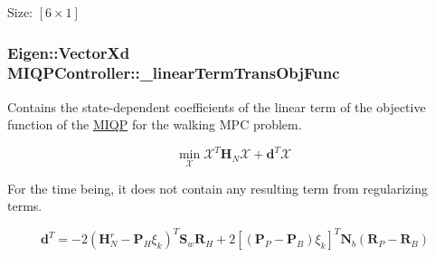 \-Size\-: $[6\times1]$ \hypertarget{classMIQPController_ac2ec0c5287589fe28f7381ebeaa5f4ef}{
\subsubsection[{\-\_\-linear\-Term\-Trans\-Obj\-Func}]{\setlength{\rightskip}{0pt plus 5cm}\-Eigen\-::\-Vector\-Xd {\bf \-M\-I\-Q\-P\-Controller\-::\-\_\-linear\-Term\-Trans\-Obj\-Func}}}\label{classMIQPController_ac2ec0c5287589fe28f7381ebeaa5f4ef}
\-Contains the state-\/dependent coefficients of the linear term of the objective function of the \hyperlink{namespaceMIQP}{\-M\-I\-Q\-P} for the walking \-M\-P\-C problem.

\[ \underset{\mathcal{X}}{\text{min}} \; \mathcal{X}^T \mathbf{H}_N \mathcal{X} + \mathbf{d}^T \mathcal{X} \]

\-For the time being, it does not contain any resulting term from regularizing terms.

\[ \mathbf{d}^T = -2(\mathbf{H}_N^r - \mathbf{P}_H \xi_k)^T \mathbf{S}_w \mathbf{R}_H + 2[(\mathbf{P}_P - \mathbf{P}_B) \xi_k]^T \mathbf{N}_b(\mathbf{R}_P - \mathbf{R}_B) \]

